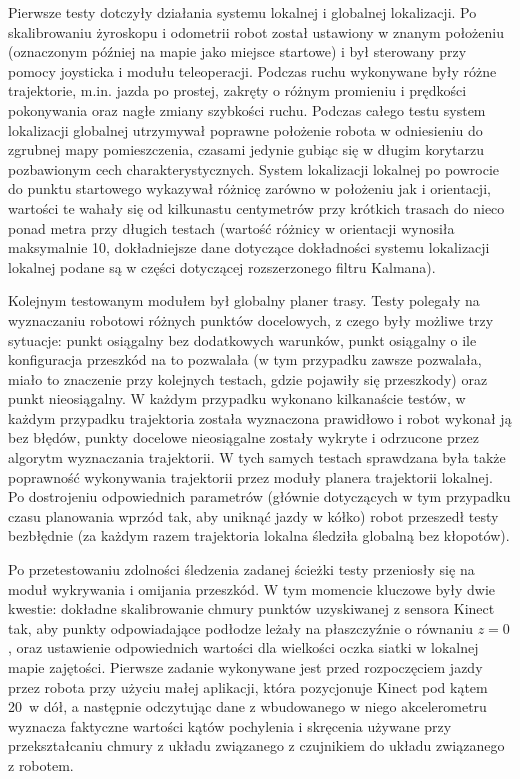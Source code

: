 Pierwsze testy dotczyły działania systemu lokalnej i globalnej lokalizacji.
Po skalibrowaniu żyroskopu i odometrii robot został ustawiony w znanym położeniu
(oznaczonym później na mapie jako miejsce startowe) i był sterowany przy pomocy
joysticka i modułu teleoperacji. Podczas ruchu wykonywane były różne trajektorie,
m.in. jazda po prostej, zakręty o różnym promieniu i prędkości pokonywania
oraz nagłe zmiany szybkości ruchu. Podczas całego testu system lokalizacji 
globalnej utrzymywał poprawne położenie robota w odniesieniu do zgrubnej mapy 
pomieszczenia, czasami jedynie gubiąc się w długim korytarzu pozbawionym 
cech charakterystycznych. System lokalizacji lokalnej po powrocie do punktu 
startowego wykazywał różnicę zarówno w położeniu jak i orientacji, wartości
te wahały się od kilkunastu centymetrów przy krótkich trasach do nieco ponad
metra przy długich testach (wartość różnicy w orientacji wynosiła maksymalnie 10\textdegree,
dokładniejsze dane dotyczące dokładności systemu lokalizacji lokalnej podane
są w części dotyczącej rozszerzonego filtru Kalmana).

Kolejnym testowanym modułem był globalny planer trasy. Testy polegały na 
wyznaczaniu robotowi różnych punktów docelowych, z czego były możliwe 
trzy sytuacje: punkt osiągalny bez dodatkowych warunków, punkt osiągalny 
o ile konfiguracja przeszkód na to pozwalała (w tym przypadku zawsze pozwalała, 
miało to znaczenie przy kolejnych testach, gdzie pojawiły się przeszkody) 
oraz punkt nieosiągalny. W każdym przypadku wykonano kilkanaście testów,
w każdym przypadku trajektoria została wyznaczona prawidłowo i robot wykonał
ją bez błędów, punkty docelowe nieosiągalne zostały wykryte i odrzucone przez 
algorytm wyznaczania trajektorii. W tych samych testach sprawdzana była także
poprawność wykonywania trajektorii przez moduły planera trajektorii lokalnej.
Po dostrojeniu odpowiednich parametrów (głównie dotyczących w tym przypadku
czasu planowania wprzód tak, aby uniknąć jazdy w kółko) robot przeszedł
testy bezbłędnie (za każdym razem trajektoria lokalna śledziła globalną 
bez kłopotów). 

Po przetestowaniu zdolności śledzenia zadanej ścieżki testy przeniosły się
na moduł wykrywania i omijania przeszkód. W tym momencie kluczowe były dwie
kwestie: dokładne skalibrowanie chmury punktów uzyskiwanej z sensora Kinect
tak, aby punkty odpowiadające podłodze leżały na płaszczyźnie o równaniu
$z=0$, oraz ustawienie odpowiednich wartości dla wielkości oczka siatki
w lokalnej mapie zajętości. Pierwsze zadanie wykonywane jest przed rozpoczęciem
jazdy przez robota przy użyciu małej aplikacji, która pozycjonuje Kinect 
pod kątem 20\textdegree ~w dół, a następnie odczytując dane z wbudowanego 
w niego akcelerometru wyznacza faktyczne wartości kątów pochylenia i skręcenia
używane przy przekształcaniu chmury z układu związanego z czujnikiem do układu
związanego z robotem. 

